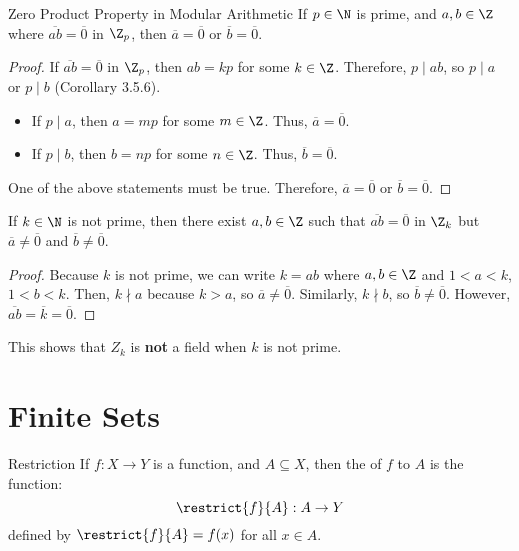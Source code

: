 \documentclass[letterpaper,12pt]{report}
\begin{document}
\begin{thmbox}{Zero Product Property in Modular Arithmetic}{}
    If $p \in \N$ is prime, and $a,b \in \Z$ where $\overline{ab} = \overline{0}$ in $\Z_p$, then $\overline{a} = \overline{0}$ or $\overline{b} = \overline{0}$.
    \tcblower
    \begin{proof}
        If $\overline{ab} = \overline{0}$ in $\Z_p$, then $ab = kp$ for some $k \in \Z$. Therefore, $p \mid ab$, so $p \mid a$ or $p \mid b$ (Corollary 3.5.6).
        \begin{itemize}
            \item If $p \mid a$, then $a = mp$ for some $m \in \Z$. Thus, $\overline{a} = \overline{0}$.
            \item If $p \mid b$, then $b = np$ for some $n \in \Z$. Thus, $\overline{b} = \overline{0}$.
        \end{itemize}
        One of the above statements must be true. Therefore, $\overline{a} = \overline{0}$ or $\overline{b} = \overline{0}$.
    \end{proof}
\end{thmbox}

\begin{exbox}{}{}
    If $k \in \N$ is not prime, then there exist $a,b \in \Z$ such that $\overline{ab} = \overline{0}$ in $\Z_k$ but $\overline{a} \neq \overline{0}$ and $\overline{b} \neq \overline{0}$.
    \tcblower
    \begin{proof}
        Because $k$ is not prime, we can write $k=ab$ where $a,b \in \Z$ and $1 < a < k$, $1 < b < k$. Then, $k \nmid a$ because $k > a$, so $\overline{a} \neq \overline{0}$. Similarly, $k \nmid b$, so $\overline{b} \neq \overline{0}$. However, $\overline{ab} = \overline{k} = \overline{0}$.
    \end{proof}
\end{exbox}

This shows that $Z_k$ is \textbf{not} a field when $k$ is not prime.

\section{Finite Sets}

\begin{dfnbox}{Restriction}{}
    If $f : X \to Y$ is a function, and $A \subseteq X$, then the  of $f$ to $A$ is the function:
    \[ \restrict{f}{A} : A \to Y \]
    defined by $\restrict{f}{A} = f(x)$ for all $x \in A$.
\end{dfnbox}
\end{document}
